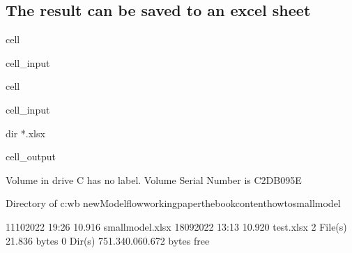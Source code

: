 \documentclass[letterpaper,10pt,english]{jupyterBook}
\begin{document}
\subsection{The result  can be saved to an excel sheet}
\label{\detokenize{content/howto/smallmodel/modelstart export up:the-result-can-be-saved-to-an-excel-sheet}}
\begin{sphinxuseclass}{cell}\begin{sphinxVerbatimInput}

\begin{sphinxuseclass}{cell_input}
\begin{sphinxVerbatim}[commandchars=\\\{\}]
\end{sphinxVerbatim}

\end{sphinxuseclass}\end{sphinxVerbatimInput}

\end{sphinxuseclass}
\begin{sphinxuseclass}{cell}\begin{sphinxVerbatimInput}

\begin{sphinxuseclass}{cell_input}
\begin{sphinxVerbatim}[commandchars=\\\{\}]
dir *.xlsx
\end{sphinxVerbatim}

\end{sphinxuseclass}\end{sphinxVerbatimInput}
\begin{sphinxVerbatimOutput}

\begin{sphinxuseclass}{cell_output}
\begin{sphinxVerbatim}[commandchars=\\\{\}]
 Volume in drive C has no label.
 Volume Serial Number is C2DB\PYGZhy{}095E

 Directory of c:\PYGZbs{}wb new\PYGZbs{}Modelflow\PYGZbs{}working\PYGZus{}paper\PYGZbs{}thebook\PYGZbs{}content\PYGZbs{}howto\PYGZbs{}smallmodel

11\PYGZhy{}10\PYGZhy{}2022  19:26            10.916 smallmodel.xlsx
18\PYGZhy{}09\PYGZhy{}2022  13:13            10.920 test.xlsx
               2 File(s)         21.836 bytes
               0 Dir(s)  751.340.060.672 bytes free
\end{sphinxVerbatim}

\end{sphinxuseclass}\end{sphinxVerbatimOutput}

\end{sphinxuseclass}
\sphinxstepscope
\end{document}
